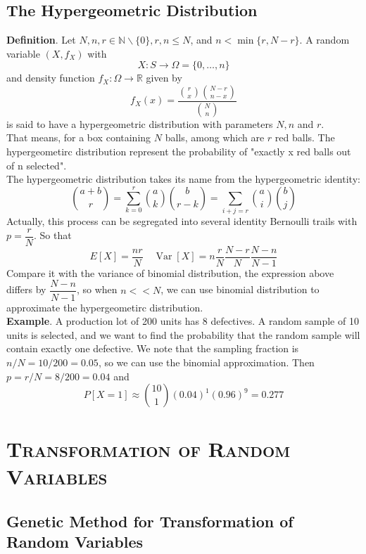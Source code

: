 \documentclass[a4paper,12pt]{article}
\begin{document}
    \subsection{The Hypergeometric Distribution}
    \textbf{Definition}. Let $N, n, r \in \mathbb{N} \backslash\{0\}, r, n \leq N$, and $n<\min \{r, N-r\}$.
A random variable $\left(X, f_X\right)$ with
$$
X: S \rightarrow \Omega=\{0, \ldots, n\}
$$
and density function $f_X: \Omega \rightarrow \mathbb{R}$ given by
\begin{equation}
f_X(x)=\dfrac{\binom{r}{x}\binom{N-r}{n-x}}{\binom{N}{n}}
\end{equation}
is said to have a hypergeometric distribution with parameters $N, n$ and $r$.\\
That means, for a box containing $N$ balls, among which are $r$ red balls. The hypergeometirc distribution represent the probability of "exactly x red balls out of n selected".\\
\noindent The hypergeometric distribution takes its name from the {hypergeometric identity}:
\begin{equation}
\binom{a+b}{r}=\sum_{k=0}^r\binom{a}{k}\binom{b}{r-k}=\sum_{i+j=r}\binom{a}{i}\binom{b}{j}
\end{equation}
Actually, this process can be segregated into several identity Bernoulli trails with $p=\dfrac{r}{N}$. So that 
$$E[X]=\dfrac{nr}{N} \quad \operatorname{Var}[X]=n \frac{r}{N} \frac{N-r}{N} \frac{N-n}{N-1}$$
Compare it with the variance of binomial distribution, the expression above differs by $\dfrac{N-n}{N-1}$, so when $n << N$, we can use binomial distribution to approximate the hypergeometirc distribution.\\
\textbf{Example}. A production lot of 200 units has 8 defectives. A random sample of 10 units is selected, and we want to find the probability that the random sample will contain exactly one defective.
We note that the sampling fraction is $n / N=10 / 200=0.05$, so we can use the binomial approximation.
Then $p=r / N=8 / 200=0.04$ and
$$
P[X=1] \approx\binom{10}{1}(0.04)^1(0.96)^9=0.277
$$








    \section{\textsc{Transformation of Random Variables}}
    \subsection{Genetic Method for Transformation of Random Variables}
    
\end{document}
